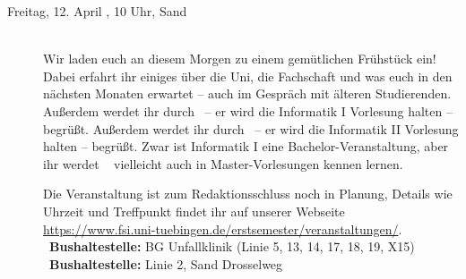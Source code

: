 \begin{description}
%




\item[Freitag, 12. April \YEAR, 10 Uhr, Sand]\ \\
Wir laden euch an diesem Morgen zu einem gemütlichen Frühstück ein! Dabei erfahrt ihr einiges über die Uni, die Fachschaft und was euch in den nächsten Monaten erwartet -- auch im Gespräch mit älteren
Studierenden. 
\ifwintersemester Außerdem werdet ihr durch \Infoprof~-- er wird die Informatik I Vorlesung halten -- begrüßt. \fi 
\ifsommersemester Außerdem werdet ihr durch \Infoprof~-- er wird die Informatik II Vorlesung halten -- begrüßt. \fi 
\ifmaster Zwar ist Informatik I eine Bachelor-Veranstaltung, aber ihr werdet \Infoprof~ vielleicht auch in Master-Vorlesungen kennen lernen. \fi

Die Veranstaltung ist zum Redaktionsschluss noch in Planung, Details wie Uhrzeit und Treffpunkt findet ihr auf unserer Webseite \url{https://www.fsi.uni-tuebingen.de/erstsemester/veranstaltungen/}.\\
\ifwintersemester {}~\textbf{Bushaltestelle:} BG Unfallklinik (Linie 5, 13, 14, 17, 18, 19, X15) \fi 
\ifsommersemester {}~\textbf{Bushaltestelle:} Linie 2, Sand Drosselweg \fi 




\end{description}

